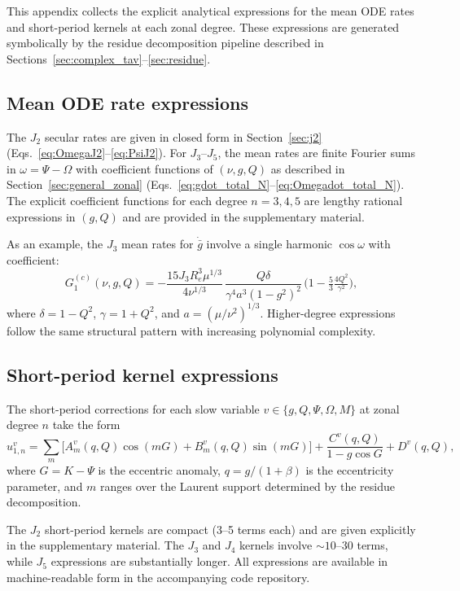 \documentclass[11pt]{article}
\begin{document}
This appendix collects the explicit analytical expressions for the mean ODE
rates and short-period kernels at each zonal degree. These expressions are
generated symbolically by the residue decomposition pipeline described in
Sections~\ref{sec:complex_tav}--\ref{sec:residue}.

\subsection{Mean ODE rate expressions}

The $J_2$ secular rates are given in closed form in
Section~\ref{sec:j2} (Eqs.~\ref{eq:OmegaJ2}--\ref{eq:PsiJ2}).
For $J_3$--$J_5$, the mean rates are finite Fourier sums in
$\omega = \Psi - \Omega$ with coefficient functions of
$(\nu, g, Q)$ as described in Section~\ref{sec:general_zonal}
(Eqs.~\ref{eq:gdot_total_N}--\ref{eq:Omegadot_total_N}). The explicit
coefficient functions for each degree $n = 3, 4, 5$ are lengthy rational
expressions in $(g, Q)$ and are provided in the supplementary material.

As an example, the $J_3$ mean rates for $\dot{\bar g}$ involve a single
harmonic $\cos\omega$ with coefficient:
\begin{equation}
G^{(c)}_1(\nu, g, Q) = -\frac{15 J_3 R_e^3 \mu^{1/3}}{4\nu^{1/3}}\,
\frac{Q\delta}{\gamma^4 a^3 (1-g^2)^2}\,
\bigl(1 - \tfrac{5}{3}\tfrac{4Q^2}{\gamma^2}\bigr),
\end{equation}
where $\delta = 1 - Q^2$, $\gamma = 1 + Q^2$, and $a = (\mu/\nu^2)^{1/3}$.
Higher-degree expressions follow the same structural pattern with increasing
polynomial complexity.

\subsection{Short-period kernel expressions}

The short-period corrections for each slow variable
$v \in \{g, Q, \Psi, \Omega, M\}$ at zonal degree $n$ take the form
\begin{equation}
u_{1,n}^v = \sum_{m} \bigl[A_m^v(q,Q) \cos(mG) + B_m^v(q,Q) \sin(mG)\bigr]
+ \frac{C^v(q,Q)}{1-g\cos G} + D^v(q,Q),
\end{equation}
where $G = K - \Psi$ is the eccentric anomaly, $q = g/(1+\beta)$ is the
eccentricity parameter, and $m$ ranges over the Laurent support determined
by the residue decomposition.

The $J_2$ short-period kernels are compact (3--5 terms each) and are
given explicitly in the supplementary material. The $J_3$ and $J_4$
kernels involve ${\sim}10$--30 terms, while $J_5$ expressions are
substantially longer. All expressions are available in machine-readable
form in the accompanying code repository.
\end{document}
